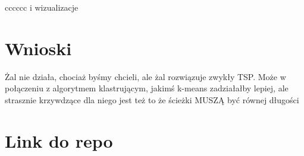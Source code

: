 \documentclass[11pt]{article}
\begin{document}
cccccc i wizualizacje

\section{Wnioski}\label{sec:wnioski}

Żal nie działa, chociaż byśmy chcieli, ale żal rozwiązuje zwykły TSP.
Może w połączeniu z algorytmem klastrującym, jakimś k-means zadziałałby lepiej, ale strasznie krzywdzące dla niego jest też to że ścieżki MUSZĄ być równej długości

\section{Link do repo}\label{sec:link-do-repo}
\end{document}
